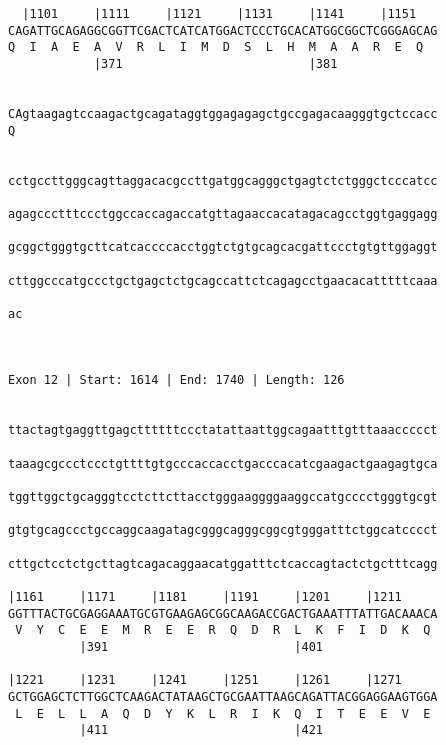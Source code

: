 \documentclass{article}
\begin{document}
\begin{Verbatim}
  |1101     |1111     |1121     |1131     |1141     |1151   
CAGATTGCAGAGGCGGTTCGACTCATCATGGACTCCCTGCACATGGCGGCTCGGGAGCAG
Q  I  A  E  A  V  R  L  I  M  D  S  L  H  M  A  A  R  E  Q  
            |371                          |381              
  
                                                            
CAgtaagagtccaagactgcagataggtggagagagctgccgagacaagggtgctccacc
Q                                                           
                                                            
  
cctgccttgggcagttaggacacgccttgatggcagggctgagtctctgggctcccatcc
                                                            
agagccctttccctggccaccagaccatgttagaaccacatagacagcctggtgaggagg
                                                            
gcggctgggtgcttcatcaccccacctggtctgtgcagcacgattccctgtgttggaggt
                                                            
cttggcccatgccctgctgagctctgcagccattctcagagcctgaacacatttttcaaa
                                                            
ac
  
  
 
Exon 12 | Start: 1614 | End: 1740 | Length: 126


ttactagtgaggttgagcttttttccctatattaattggcagaatttgtttaaaccccct
                                                            
taaagcgccctccctgttttgtgcccaccacctgacccacatcgaagactgaagagtgca
                                                            
tggttggctgcagggtcctcttcttacctgggaaggggaaggccatgcccctgggtgcgt
                                                            
gtgtgcagccctgccaggcaagatagcgggcagggcggcgtgggatttctggcatcccct
                                                            
cttgctcctctgcttagtcagacaggaacatggatttctcaccagtactctgctttcagg
                                                            
|1161     |1171     |1181     |1191     |1201     |1211     
GGTTTACTGCGAGGAAATGCGTGAAGAGCGGCAAGACCGACTGAAATTTATTGACAAACA
 V  Y  C  E  E  M  R  E  E  R  Q  D  R  L  K  F  I  D  K  Q 
          |391                          |401                
  
|1221     |1231     |1241     |1251     |1261     |1271     
GCTGGAGCTCTTGGCTCAAGACTATAAGCTGCGAATTAAGCAGATTACGGAGGAAGTGGA
 L  E  L  L  A  Q  D  Y  K  L  R  I  K  Q  I  T  E  E  V  E 
          |411                          |421                
  

\end{Verbatim}
\end{document}
